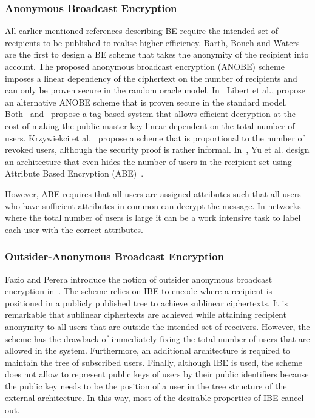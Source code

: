 \subsubsection{Anonymous Broadcast Encryption}
All earlier mentioned references describing BE require the intended set of recipients to be published to realise higher efficiency. Barth, Boneh and Waters~\cite{art:BarthBW06} are the first to design a BE scheme that takes the anonymity of the recipient into account. The proposed anonymous broadcast encryption (ANOBE) scheme imposes a linear dependency of the ciphertext on the number of recipients and can only be proven secure in the random oracle model. In~\cite{art:LibertPQ12} Libert et al., propose an alternative ANOBE scheme that is proven secure in the standard model. Both~\cite{art:BarthBW06} and~\cite{art:LibertPQ12} propose a tag based system that allows efficient decryption at the cost of making the public master key linear dependent on the total number of users. Krzywiekci et al.~\cite{art:KrzywieckiKK06} propose a scheme that is proportional to the number of revoked users, although the security proof is rather informal. In~\cite{art:YuRL10}, Yu et al. design an architecture that even hides the number of users in the recipient set using Attribute Based Encryption (ABE)~\cite{art:FazioP12}.

However, ABE requires that all users are assigned attributes such that all users who have sufficient attributes in common can decrypt the message. In networks where the total number of users is large it can be a work intensive task to label each user with the correct attributes.

\subsubsection{Outsider-Anonymous Broadcast Encryption}
Fazio and Perera introduce the notion of outsider anonymous broadcast encryption in~\cite{art:FazioP12}. The scheme relies on IBE to encode where a recipient is positioned in a publicly published tree to achieve sublinear ciphertexts. It is remarkable that sublinear ciphertexts are achieved while attaining recipient anonymity to all users that are outside the intended set of receivers. However, the scheme has the drawback of immediately fixing the total number of users that are allowed in the system. Furthermore, an additional architecture is required to maintain the tree of subscribed users. Finally, although IBE is used, the scheme does not allow to represent public keys of users by their public identifiers because the public key needs to be the position of a user in the tree structure of the external architecture. In this way, most of the desirable properties of IBE cancel out.

